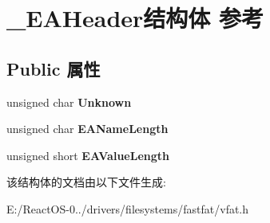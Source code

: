 \hypertarget{struct___e_a_header}{}\section{\+\_\+\+E\+A\+Header结构体 参考}
\label{struct___e_a_header}
\subsection*{Public 属性}
\begin{DoxyCompactItemize}
\item 
\mbox{\label{struct___e_a_header_a123c82ceac8a4b949a53821ca04461d0}} 
unsigned char {\bfseries Unknown}
\item 
\mbox{\label{struct___e_a_header_a19b3e459ed9d5ebd43a0ef7cd714ab85}} 
unsigned char {\bfseries E\+A\+Name\+Length}
\item 
\mbox{\label{struct___e_a_header_ab88189c8c7ae625c62964b1f6021ceda}} 
unsigned short {\bfseries E\+A\+Value\+Length}
\end{DoxyCompactItemize}


该结构体的文档由以下文件生成\+:\begin{DoxyCompactItemize}
\item 
E\+:/\+React\+O\+S-\/0../drivers/filesystems/fastfat/vfat.\+h\end{DoxyCompactItemize}
